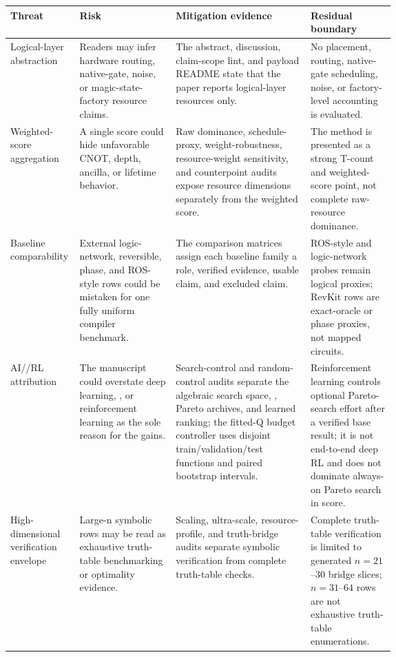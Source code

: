 \begin{tabularx}{\linewidth}{>{\raggedright\arraybackslash}p{0.18\linewidth}>{\raggedright\arraybackslash}p{0.25\linewidth}>{\raggedright\arraybackslash}X>{\raggedright\arraybackslash}p{0.22\linewidth}}
\toprule
Threat & Risk & Mitigation evidence & Residual boundary \\
\midrule
Logical-layer abstraction & Readers may infer hardware routing, native-gate, noise, or magic-state-factory resource claims. & The abstract, discussion, claim-scope lint, and payload README state that the paper reports logical-layer resources only. & No placement, routing, native-gate scheduling, noise, or factory-level accounting is evaluated. \\
Weighted-score aggregation & A single score could hide unfavorable CNOT, depth, ancilla, or lifetime behavior. & Raw dominance, schedule-proxy, weight-robustness, resource-weight sensitivity, and counterpoint audits expose resource dimensions separately from the weighted score. & The method is presented as a strong T-count and weighted-score point, not complete raw-resource dominance. \\
Baseline comparability & External logic-network, reversible, phase, and ROS-style rows could be mistaken for one fully uniform compiler benchmark. & The comparison matrices assign each baseline family a role, verified evidence, usable claim, and excluded claim. & ROS-style and logic-network probes remain logical proxies; RevKit rows are exact-oracle or phase proxies, not mapped circuits. \\
AI/\mcts{}/RL attribution & The manuscript could overstate deep learning, \mcts{}, or reinforcement learning as the sole reason for the gains. & Search-control and random-control audits separate the algebraic search space, \mcts{}, Pareto archives, and learned ranking; the fitted-Q budget controller uses disjoint train/validation/test functions and paired bootstrap intervals. & Reinforcement learning controls optional Pareto-search effort after a verified base result; it is not end-to-end deep RL and does not dominate always-on Pareto search in score. \\
High-dimensional verification envelope & Large-n symbolic rows may be read as exhaustive truth-table benchmarking or optimality evidence. & Scaling, ultra-scale, resource-profile, and truth-bridge audits separate symbolic verification from complete truth-table checks. & Complete truth-table verification is limited to generated $n=21$--$30$ bridge slices; $n=31$--$64$ rows are not exhaustive truth-table enumerations. \\

\end{tabularx}
